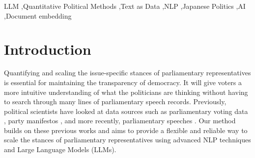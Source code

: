 \documentclass[final,5p,times,twocolumn,authoryear]{elsarticle}
\begin{document}
\begin{frontmatter}
\begin{abstract}
	
	\end{abstract}
	
	
	
	\begin{keyword}
	LLM \sep Quantitative Political Methods \sep Text as Data \sep NLP \sep Japanese Politics \sep AI \sep Document embedding
	
	
	
	\end{keyword}
	
	
\end{frontmatter}

\onecolumn
\thispagestyle{empty}
	


\clearpage



\tableofcontents
\newpage
\listoffigures
\newpage
\listoftables

\twocolumn
{}

\section{Introduction}
Quantifying and scaling the issue-specific stances of parliamentary representatives is essential for maintaining the transparency of democracy. It will give voters a more intuitive understanding of what the politicians are thinking without having to search through many lines of parliamentary speech records. Previously, political scientists have looked at data sources such as parliamentary voting data \citep{dw-nominate}, party manifestos \citep{CATALINAC_2018}, and more recently, parliamentary speeches \citep{Word-embeddings-for-analysis-of-ideological-placement}. Our method builds on these previous works and aims to provide a flexible and reliable way to scale the stances of parliamentary representatives using advanced NLP techniques and Large Language Models (LLMs).
\end{document}
